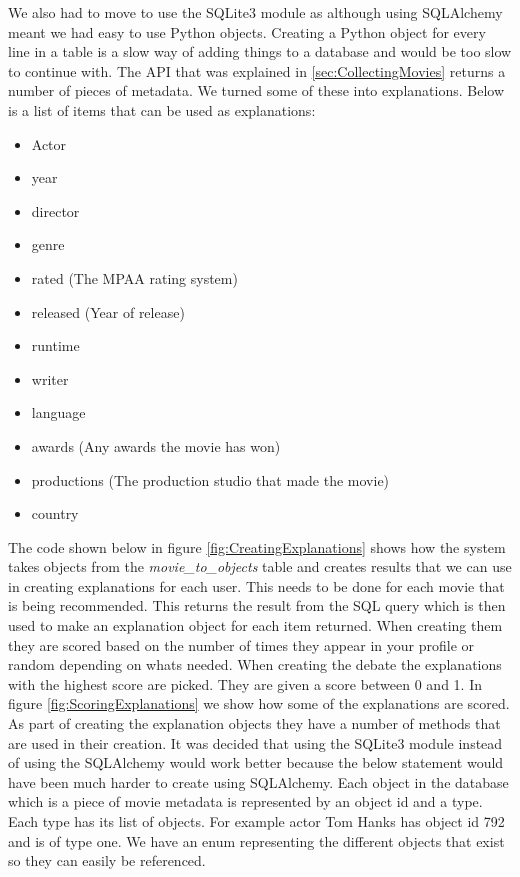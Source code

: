                 We also had to move to use the SQLite3 module as although using SQLAlchemy meant we had easy to use Python objects. Creating a Python object for every line in a table is a slow way of adding things to a database and would be too slow to continue with. The API that was explained in \ref{sec:CollectingMovies} returns a number of pieces of metadata. We turned some of these into explanations. Below is a list of items that can be used as explanations:
                \begin{itemize}
                    \item Actor
                    \item year 
                    \item director
                    \item genre 
                    \item rated (The MPAA rating system)
                    \item released (Year of release)
                    \item runtime 
                    \item writer 
                    \item language 
                    \item awards (Any awards the movie has won)
                    \item productions (The production studio that made the movie)
                    \item country
                \end{itemize}
        
                The code shown below in figure \ref{fig:CreatingExplanations} shows how the system takes objects from the \textit{movie\_to\_objects} table and creates results that we can use in creating explanations for each user. This needs to be done for each movie that is being recommended. This returns the result from the SQL query which is then used to make an explanation object for each item returned. When creating them they are scored based on the number of times they appear in your profile or random depending on whats needed. When creating the debate the explanations with the highest score are picked. They are given a score between 0 and 1. In figure \ref{fig:ScoringExplanations} we show how some of the explanations are scored. As part of creating the explanation objects they have a number of methods that are used in their creation. It was decided that using the SQLite3 module instead of using the SQLAlchemy would work better because the below statement would have been much harder to create using SQLAlchemy. Each object in the database which is a piece of movie metadata is represented by an object id and a type. Each type has its list of objects. For example actor Tom Hanks has object id 792 and is of type one. We have an enum representing the different objects that exist so they can easily be referenced.
                
